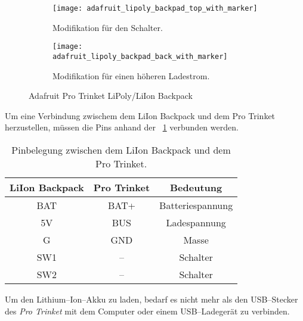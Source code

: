 \begin{figure}
	\centering
	\begin{subfigure}[t]{0.4\textwidth}
		\texttt{[image: adafruit\_lipoly\_backpad\_top\_with\_marker]}
		\caption{Modifikation für den Schalter.}
		\label{fig:pro_trinket_liion_backpack_top}
	\end{subfigure}
	\qquad
	\begin{subfigure}[t]{0.4\textwidth}
		\texttt{[image: adafruit\_lipoly\_backpad\_back\_with\_marker]}
		\caption{Modifikation für einen höheren Ladestrom.}
		\label{fig:pro_trinket_liion_backpack_bottom}
	\end{subfigure}
	\caption{Adafruit Pro Trinket LiPoly/LiIon Backpack}
	\label{fig:pro_trinket_liion_backpack}
\end{figure}

Um eine Verbindung zwischem dem LiIon Backpack und dem Pro Trinket herzustellen, müssen die Pins anhand der \tablename~\ref{tab:pin_assignment_between_liion_backpack_and_pro_trinket} verbunden werden.

\begin{table}
	\centering
	\begin{tabular}{||c|c|c||} 
		\hline
		LiIon Backpack&Pro Trinket&Bedeutung\\\hline
		\hline
		BAT & BAT+ & Batteriespannung\\\hline
		5V & BUS & Ladespannung\\\hline
		G & GND & Masse\\\hline
		\hline
		SW1 & -- & Schalter\\\hline
		SW2 & -- & Schalter\\\hline
	\end{tabular}
	\caption{Pinbelegung zwischen dem LiIon Backpack und dem Pro Trinket.}
	\label{tab:pin_assignment_between_liion_backpack_and_pro_trinket}
\end{table}

Um den Lithium--Ion--Akku zu laden, bedarf es nicht mehr als den USB--Stecker des \textit{Pro Trinket} mit dem Computer oder einem USB--Ladegerät zu verbinden.


\begin{comment}
------------------------------------------------------------------------------------------
\end{comment}
